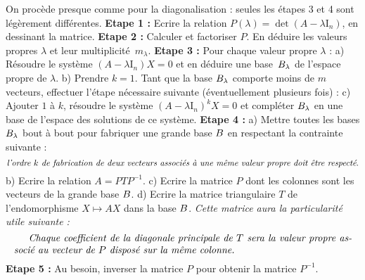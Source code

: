 On procède presque comme pour la diagonalisation : seules les étapes 3 et 4 sont légèrement différentes. 
\medskip
\noindent
{\bf Etape 1 : }Ecrire la relation $P(\lambda)=\det(A-\lambda\mbox{I}_n)$, en dessinant la matrice. \medskip\noindent
\medskip
\noindent
{\bf Etape 2 : }Calculer et factoriser $P$. En déduire les valeurs propres $\lambda$ et leur multiplicité~$m_\lambda$.\medskip\noindent
\medskip
\noindent
{\bf Etape 3 : }Pour chaque valeur propre $\lambda$ : \pn 
a) Résoudre le système $(A-\lambda\mbox{I}_n)X=0$ et en déduire une base~$\sc B_\lambda$ de l'espace propre de $\lambda$. \pn
b) Prendre $k=1$. Tant que la base $\sc B_\lambda$ comporte moins de $m$ vecteurs, effectuer l'étape nécessaire suivante (éventuellement plusieurs fois) :
c) Ajouter $1$ à $k$, résoudre le système $(A-\lambda\mbox{I}_n)^kX=0$ et compléter $\sc B_\lambda$ en une base de l'espace des solutions de ce système. 
\medskip\noindent
{\bf Etape 4 : } a) Mettre toutes les bases $\sc B_\lambda$ bout à bout pour fabriquer une grande base $\sc B$ en respectant la contrainte suivante : 
$$
\mbox{\it l'ordre $k$ de fabrication de deux vecteurs associés à une même valeur propre doit être respecté}. 
$$
b) Ecrire la relation $A=PTP^{-1}$. \pn
c) Ecrire la matrice $P$ dont les colonnes sont les vecteurs de la grande base $\sc B$. \pn
d) Ecrire la matrice triangulaire $T$ de l'endomorphisme $X\mapsto AX$ dans la base $\sc B$. \pn
{\it Cette matrice aura la particularité utile suivante :}
$$ 
\vbox{\it Chaque coefficient de la diagonale principale de $T$ sera la valeur propre associé au vecteur de $P$ disposé sur la même colonne.} 
$$
{\bf Etape 5 : }Au besoin, inverser la matrice $P$ pour obtenir la matrice $P^{-1}$. 

